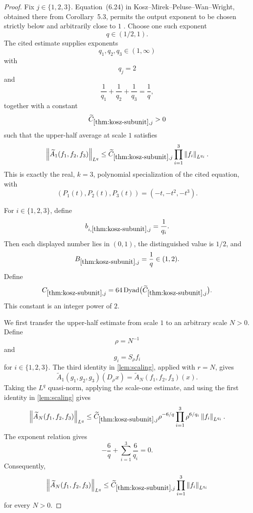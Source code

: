 \documentclass[11pt]{article}
\newcommand{\Dyad}{\operatorname{Dyad}}
\newcommand{\norm}[2]{\left\lVert #1\right\rVert_{#2}}
\newcommand{\Cst}[2]{C_{\ref{#1},#2}}
\newcommand{\indices}{\{1,2,3\}}
\begin{document}
	\begin{proof}
		Fix \(j\in\indices\).  Equation~(6.24) in Kosz--Mirek--Peluse--Wan--Wright, obtained there from Corollary~5.3, permits the output exponent to be chosen strictly below and arbitrarily close to \(1\) \cite[Corollary~5.3 and equation~(6.24)]{KoszEtAl}.  Choose one such exponent
		\[
		q\in(1/2,1).
		\]
		The cited estimate supplies exponents
		\[
		q_1,q_2,q_3\in(1,\infty)
		\]
		with
		\[
		q_j=2
		\]
		and
		\[
		\frac1{q_1}+\frac1{q_2}+\frac1{q_3}=\frac1q,
		\]
		together with a constant
		\[
		\widetilde C_{\ref{thm:kosz-subunit},j}>0
		\]
		such that the upper-half average at scale \(1\) satisfies
		\[
		\norm{\widetilde A_1(f_1,f_2,f_3)}{L^q}
		\leq
		\widetilde C_{\ref{thm:kosz-subunit},j}
		\prod_{i=1}^{3}\norm{f_i}{L^{q_i}}.
		\]
		This is exactly the real, \(k=3\), polynomial specialization of the cited equation, with
		\[
		(P_1(t),P_2(t),P_3(t))=(-t,-t^2,-t^3).
		\]
		
		For \(i\in\indices\), define
		\[
		b_{i,\ref{thm:kosz-subunit},j}=\frac1{q_i}.
		\]
		Then each displayed number lies in \((0,1)\), the distinguished value is \(1/2\), and
		\[
		B_{\ref{thm:kosz-subunit},j}=\frac1q\in(1,2).
		\]
		Define
		\[
		\Cst{thm:kosz-subunit}{j}
		=
		64\Dyad\bigl(\widetilde C_{\ref{thm:kosz-subunit},j}\bigr).
		\]
		This constant is an integer power of \(2\).
		
		We first transfer the upper-half estimate from scale \(1\) to an arbitrary scale \(N>0\).  Define
		\[
		\rho=N^{-1}
		\]
		and
		\[
		g_i=S_\rho f_i
		\]
		for \(i\in\indices\).  The third identity in \cref{lem:scaling}, applied with \(r=N\), gives
		\[
		\widetilde A_1(g_1,g_2,g_3)(D_\rho x)
		=
		\widetilde A_N(f_1,f_2,f_3)(x).
		\]
		Taking the \(L^q\) quasi-norm, applying the scale-one estimate, and using the first identity in \cref{lem:scaling} gives
		\[
		\norm{\widetilde A_N(f_1,f_2,f_3)}{L^q}
		\leq
		\widetilde C_{\ref{thm:kosz-subunit},j}
		\rho^{-6/q}
		\prod_{i=1}^{3}\rho^{6/q_i}\norm{f_i}{L^{q_i}}.
		\]
		The exponent relation gives
		\[
		-\frac6q+\sum_{i=1}^{3}\frac6{q_i}=0.
		\]
		Consequently,
		\[
		\norm{\widetilde A_N(f_1,f_2,f_3)}{L^q}
		\leq
		\widetilde C_{\ref{thm:kosz-subunit},j}
		\prod_{i=1}^{3}\norm{f_i}{L^{q_i}}
		\]
		for every \(N>0\).
		

\end{proof}
\end{document}
